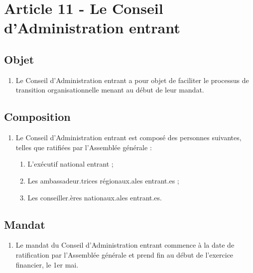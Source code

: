 \section{Article 11 - Le Conseil d'Administration entrant}
\label{article-11-le-conseil-d-administration-entrant}

\subsection{Objet}
\label{objet-conseil-entrant}

\begin{enumerate}
 \item
  Le Conseil d'Administration entrant a pour objet de faciliter le processus de transition organisationnelle menant au début de leur mandat.
\end{enumerate}

\subsection{Composition}
\label{composition-conseil-entrant}

\begin{enumerate}
 \item
  Le Conseil d'Administration entrant est composé des personnes suivantes, telles que ratifiées par l'Assemblée générale :
  \begin{enumerate}
   \item
    L'exécutif national entrant ;
   \item
    Les ambassadeur.trices régionaux.ales entrant.es ;
   \item
    Les conseiller.ères nationaux.ales entrant.es.
  \end{enumerate}
\end{enumerate}

\subsection{Mandat}
\label{mandat-conseil-entrant}

\begin{enumerate}
 \item
  Le mandat du Conseil d'Administration entrant commence à la date de ratification par l'Assemblée générale et prend fin au début de l'exercice financier, le 1er mai.
\end{enumerate}
